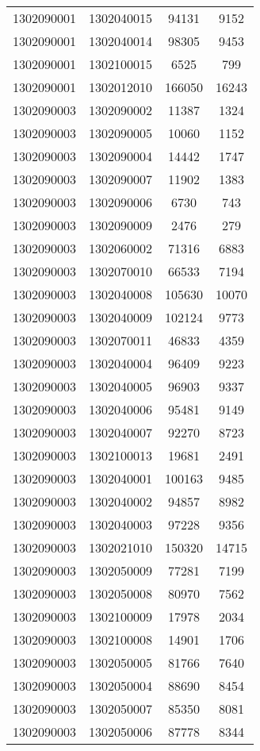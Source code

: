 \begin{longtable}[h]{llcc}
		1302090001 & 1302040015 & 94131 & 9152\\
		1302090001 & 1302040014 & 98305 & 9453\\
		1302090001 & 1302100015 & 6525 & 799\\
		1302090001 & 1302012010 & 166050 & 16243\\
		1302090003 & 1302090002 & 11387 & 1324\\
		1302090003 & 1302090005 & 10060 & 1152\\
		1302090003 & 1302090004 & 14442 & 1747\\
		1302090003 & 1302090007 & 11902 & 1383\\
		1302090003 & 1302090006 & 6730 & 743\\
		1302090003 & 1302090009 & 2476 & 279\\
		1302090003 & 1302060002 & 71316 & 6883\\
		1302090003 & 1302070010 & 66533 & 7194\\
		1302090003 & 1302040008 & 105630 & 10070\\
		1302090003 & 1302040009 & 102124 & 9773\\
		1302090003 & 1302070011 & 46833 & 4359\\
		1302090003 & 1302040004 & 96409 & 9223\\
		1302090003 & 1302040005 & 96903 & 9337\\
		1302090003 & 1302040006 & 95481 & 9149\\
		1302090003 & 1302040007 & 92270 & 8723\\
		1302090003 & 1302100013 & 19681 & 2491\\
		1302090003 & 1302040001 & 100163 & 9485\\
		1302090003 & 1302040002 & 94857 & 8982\\
		1302090003 & 1302040003 & 97228 & 9356\\
		1302090003 & 1302021010 & 150320 & 14715\\
		1302090003 & 1302050009 & 77281 & 7199\\
		1302090003 & 1302050008 & 80970 & 7562\\
		1302090003 & 1302100009 & 17978 & 2034\\
		1302090003 & 1302100008 & 14901 & 1706\\
		1302090003 & 1302050005 & 81766 & 7640\\
		1302090003 & 1302050004 & 88690 & 8454\\
		1302090003 & 1302050007 & 85350 & 8081\\
		1302090003 & 1302050006 & 87778 & 8344\\

\end{longtable}

